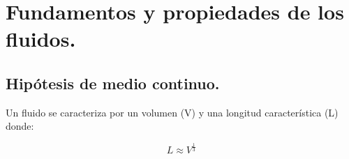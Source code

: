 
\chapter{Fundamentos y propiedades de los fluidos.}
	\section{Hipótesis de medio continuo.}
Un fluido se caracteriza por un volumen (V) y una longitud característica (L) donde:

\[L \approx V^{\frac{1}{3}}\]

%	

